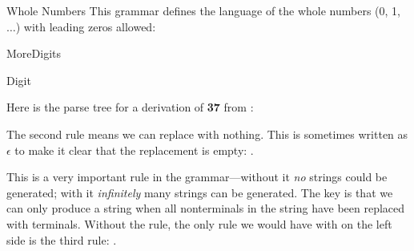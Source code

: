 \clearpage %
\begin{examplenobar}{Whole Numbers}\label{example:wholenumbers} This grammar defines the language of the whole numbers (0, 1, $\ldots$) with leading zeros allowed:
\vspace*{6pt}

\begin{minipage}[b]{0.5\linewidth}
\begin{bnfgrammarm}{MoreDigits}
\end{bnfgrammarm}
\end{minipage}
\begin{minipage}[b]{0.4\linewidth}
\begin{bnfgrammarm}{Digit}
\end{bnfgrammarm}
\end{minipage}

Here is the parse tree for a derivation of {\bf 37} from :
\begin{centernospace}
\end{centernospace}
  The second rule means we can replace  with nothing.  This is sometimes written as $\epsilon$ to make it clear that the replacement is empty: .

This is a very important rule in the grammar---without it \emph{no} strings could be generated; with it \emph{infinitely} many strings can be generated.  The key is that we can only produce a string when all nonterminals in the string have been replaced with terminals.  Without the  rule, the only rule we would have with  on the left side is the third rule: .


\end{examplenobar}
